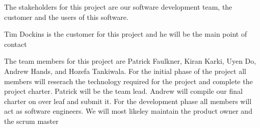 The stakeholders for this project are our software development team, the customer and the users of this software.

Tim Dockins is the customer for this project and he will be the main point of contact

The team members for this project are Patrick Faulkner, Kiran Karki, Uyen Do, Andrew Hands, and Hozefa Tankiwala. 
For the initial phase of the project all members will reserach the technology required for the project and complete the project charter.
Patrick will be the team lead. Andrew will compile our final charter on over leaf and submit it. 
For the development phase all members will act as software engineers.
We will most likeley maintain the product owner and the scrum master


